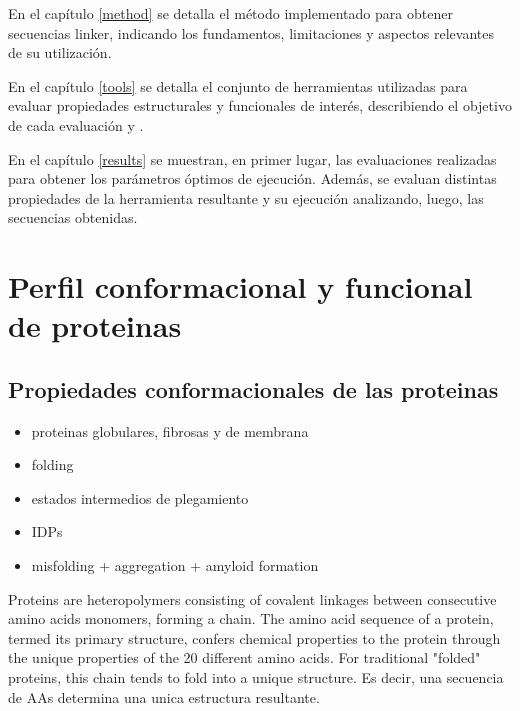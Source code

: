 En el capítulo \ref{method} se detalla el método implementado para obtener secuencias linker, indicando los fundamentos, limitaciones y aspectos relevantes de su utilización.

En el capítulo \ref{tools} se detalla el conjunto de herramientas utilizadas para evaluar propiedades estructurales y funcionales de interés, describiendo el objetivo de cada evaluación y . 

En el capítulo \ref{results} se muestran, en primer lugar, las evaluaciones realizadas para obtener los parámetros óptimos de ejecución. 
Además, se evaluan distintas propiedades de la herramienta resultante y su ejecución analizando, luego, las secuencias obtenidas. 




\section{Perfil conformacional y funcional de proteinas}
\label{proteinLandscape}



\subsection{Propiedades conformacionales de las proteinas}
\label{conformationalLandscape}

\begin{itemize}
 \item proteinas globulares, fibrosas y de membrana
 \item folding
 \item estados intermedios de plegamiento
 \item IDPs
 \item misfolding + aggregation + amyloid formation
\end{itemize}







Proteins are heteropolymers consisting of covalent linkages between consecutive amino
acids monomers, forming a chain. The amino acid sequence of a protein, termed its
primary structure, confers chemical properties to the protein through the unique
properties of the 20 different amino acids.
For traditional "folded" proteins, this chain tends to fold into a unique structure. Es decir, una secuencia de AAs determina una unica estructura resultante.


